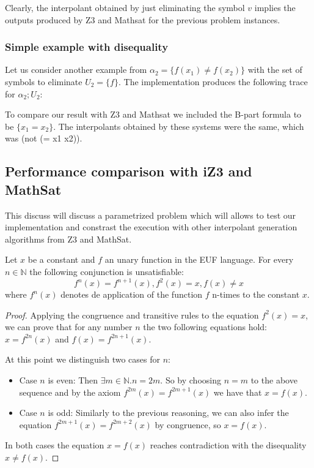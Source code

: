 Clearly, the interpolant obtained by just eliminating the symbol $v$ implies
the outputs produced by Z3 and Mathsat for the previous problem instances.

\subsubsection{Simple example with disequality}

Let us consider another example from \cite{KAPUR2017} 
$\alpha_2 = \{f(x_1) \neq f(x_2)\}$
with the set of symbols to eliminate $U_2 = \{f\}$. The implementation produces the following
trace for $\alpha_2; U_2$:



To compare our result with Z3 and Mathsat we 
included the B-part formula to be $\{x_1 = x_2\}$.
The interpolants obtained by these systems were the 
same, which was (not (= x1 x2)).

\subsection{Performance comparison with iZ3 and MathSat}\label{performance_euf}

This discuss will discuss a parametrized problem which will allows to test 
our implementation and constrast the execution with other interpolant generation
algorithms from Z3 and MathSat.

\begin{lemma} \label{performance_test_lemma}
  Let $x$ be a constant and $f$ an unary function in the EUF language. 
  For every $n \in \mathbb{N}$ the following conjunction is unsatisfiable:
  \begin{equation*}
    f^n(x) = f^{n+1}(x), f^2(x) = x, f(x) \neq x
  \end{equation*}
  where $f^n(x)$ denotes de application of the function $f$ n-times
  to the constant $x$.
\end{lemma}

\begin{proof}
  Applying the congruence and transitive rules to the equation $f^2(x) = x$, 
  we can prove that for any number $n$ the two following equations hold:
  $x = f^{2n}(x)$ and $f(x) = f^{2n+1}(x)$.

  At this point we distinguish two cases for $n$:

  \begin{itemize}
    \item Case $n$ is even: Then $\exists m \in \mathbb{N} . n = 2m$.
      So by choosing $n = m$ to the above sequence
      and by the axiom $f^{2m}(x) = f^{2m+1}(x)$ we have that
      $x = f(x)$.
    \item Case $n$ is odd: Similarly to the previous reasoning, 
      we can also infer the equation $f^{2m+1}(x) = f^{2m+2}(x)$
      by congruence, so $x = f(x)$.
    \end{itemize}

    In both cases the equation $x = f(x)$ reaches contradiction with the
    disequality $x \neq f(x)$.
\end{proof}

